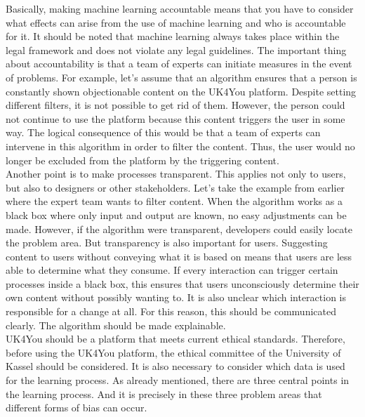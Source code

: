 Basically, making machine learning accountable means that you have to consider what effects can arise from the use of machine learning and who is accountable for it.
It should be noted that machine learning always takes place within the legal framework and does not violate any legal guidelines.
The important thing about accountability is that a team of experts can initiate measures in the event of problems.
For example, let's assume that an algorithm ensures that a person is constantly shown objectionable content on the UK4You platform.
Despite setting different filters, it is not possible to get rid of them.
However, the person could not continue to use the platform because this content triggers the user in some way.
The logical consequence of this would be that a team of experts can intervene in this algorithm in order to filter the content.
Thus, the user would no longer be excluded from the platform by the triggering content.\\

Another point is to make processes transparent. 
This applies not only to users, but also to designers or other stakeholders.
Let's take the example from earlier where the expert team wants to filter content.
When the algorithm works as a black box where only input and output are known, no easy adjustments can be made.
However, if the algorithm were transparent, developers could easily locate the problem area.
But transparency is also important for users. 
Suggesting content to users without conveying what it is based on means that users are less able to determine what they consume.
If every interaction can trigger certain processes inside a black box, this ensures that users unconsciously determine their own content without possibly wanting to.
It is also unclear which interaction is responsible for a change at all.
For this reason, this should be communicated clearly. 
The algorithm should be made explainable.\\

UK4You should be a platform that meets current ethical standards.
Therefore, before using the UK4You platform, the ethical committee of the University of Kassel should be considered.
It is also necessary to consider which data is used for the learning process.
As already mentioned, there are three central points in the learning process.
And it is precisely in these three problem areas that different forms of bias can occur\cite{framework-understanding-ml}.\\

